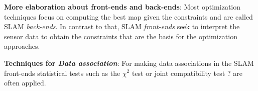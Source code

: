 \textbf{More elaboration about front-ends and back-ends}: Most optimization techniques focus on computing the best map given the constraints and are called SLAM \emph{back-ends}. In contrast to that, SLAM \emph{front-ends} seek to interpret the sensor data to obtain the constraints that are the basis for the optimization approaches.

\textbf{Techniques for \emph{Data association}}: For making data associations in the SLAM front-ends statistical tests such as the $\chi^2$ test or joint compatibility test {\color{red} ?} are often applied.




